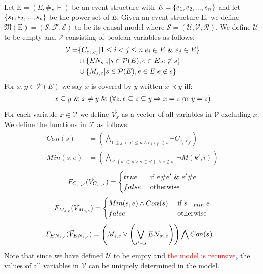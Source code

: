 Let $\mathrm{E} = (E,\#,\vdash)$ be an event structure with
$E = \{e_1, e_2, ...,e_n\}$ and let $\{s_1,s_2,...,s_p\}$ be the power set of $E$.
Given an event structure $\mathrm{E}$, we define
$\mathfrak{M}(\mathrm{E}) = (\mathcal{S},\mathscr{F},\mathcal{E})$
to be its causal model where
$\mathcal{S} = (\mathcal{U},\mathcal{V},\mathcal{R})$.
We define $\mathcal{U}$ to be empty and $\mathcal{V}$ consisting
of boolean variables as follows:
\begin{align*}
    \mathcal{V} = & \{C_{e_i,e_j} |  1 \leq i < j \leq n.
    e_i \in E \ \& \  e_j \in E\}                                    \\
                  & \cup \{EN_{s,e} | s \in \mathcal{P}(E),
    e \in E. e \not \in s \}                                      \\
                  & \cup \{M_{s,e} | s \in \mathcal{P}(E),
    e \in E. e \not \in s \}                                      \\
\end{align*}
For $x,y \in \mathcal{P}(E)$ we say $x$ is covered by $y$ written $ x \prec y$ iff:
\begin{align*}
    x \subseteq y \ \& \  x \neq y \ \& \ 
    (\forall z. x \subseteq z \subseteq y \Rightarrow x = z
    \text{ or } y = z)
\end{align*}
For each variable $x \in \mathcal{V}$ we define $\vec V_x$ as a vector
of all variables in $\mathcal{V}$ excluding $x$.
We define the functions in $\mathscr{F}$ as follows:
\begin{align*}
    Con(s)   & =   \left(
    \bigwedge_{ 1\leq j<j' \leq n \wedge e_j,e_{j'} \in s}
    \neg C_{e_j,e_{j'}}
    \right)               \\
    Min(s,e) & = \left(
    \bigwedge_{s'. (s' \subset s \vee s \subset s')
        \wedge e \notin s'}
    \neg M(k',i)
    \right)
\end{align*}
$$
    F_{C_{e,e'}}(\vec V_{C_{e,e'}}) = \begin{cases}
        true  & \text{ if } e \# e' \ \& \  e' \# e \\
        false & \text{ otherwise }
    \end{cases}
$$
$$
    F_{M_{s,e}}(\vec V_{M_{s,e}}) = \begin{cases}
        Min(s,e) \wedge Con(s) & \text{ if } s \vdash_{min} e \\
        false                  & \text{ otherwise }
    \end{cases}
$$
\begin{align*}
    F_{EN_{s,e}}(\vec V_{EN_{s,e}}) & =
    \left(
    M_{s,e} \vee
    \left(
    \bigvee_{s'\prec s}EN_{s',e}
    \right)
    \right)
    \bigwedge
    Con(s)
\end{align*}
Note that since we have defined $\mathcal{U}$ to be empty and
\textcolor{red}{the model is recursive}, the values of all variables in
$\mathcal{V}$ can be uniquely determined in the model.

